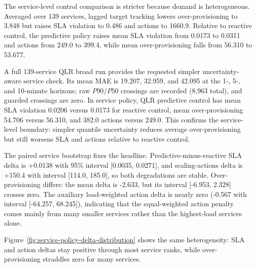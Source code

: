 The service-level control comparison is stricter because demand is heterogeneous. Averaged over 139 services, lagged target tracking lowers over-provisioning to 3.848 but raises SLA violation to 0.486 and actions to 1660.9. Relative to reactive control, the predictive policy raises mean SLA violation from 0.0173 to 0.0311 and actions from 249.0 to 399.4, while mean over-provisioning falls from 56.310 to 53.677.

A full 139-service QLR broad run provides the requested simpler uncertainty-aware service check. Its mean MAE is 19.207, 32.959, and 42.095 at the 1-, 5-, and 10-minute horizons; raw $P90/P50$ crossings are recorded (8{,}963 total), and guarded crossings are zero. In service policy, QLR predictive control has mean SLA violation 0.0206 versus 0.0173 for reactive control, mean over-provisioning 54.706 versus 56.310, and 382.0 actions versus 249.0. This confirms the service-level boundary: simpler quantile uncertainty reduces average over-provisioning but still worsens SLA and actions relative to reactive control.

The paired service bootstrap fixes the headline. Predictive-minus-reactive SLA delta is +0.0138 with 95\% interval [0.0035, 0.0271], and scaling-actions delta is +150.4 with interval [114.0, 185.0], so both degradations are stable. Over-provisioning differs: the mean delta is -2.633, but its interval [-6.953, 2.328] crosses zero. The auxiliary load-weighted action delta is nearly zero (-0.567 with interval [-64.257, 68.245]), indicating that the equal-weighted action penalty comes mainly from many smaller services rather than the highest-load services alone.

Figure~\ref{fig:service-policy-delta-distribution} shows the same heterogeneity: SLA and action deltas stay positive through most service ranks, while over-provisioning straddles zero for many services.

